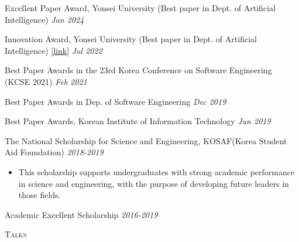 \documentclass[10pt]{article}
\newenvironment{changemargin}[2]{
  \begin{list}{}{
    \setlength{\topsep}{0pt}
    \setlength{\leftmargin}{#1}
    \setlength{\rightmargin}{#2}
    \setlength{\listparindent}{\parindent}
    \setlength{\itemindent}{\parindent}
    \setlength{\parsep}{\parskip}
  }
  \item[]}{\end{list}
}
\newcommand{\lineover}{
	\begin{changemargin}{-0.05in}{-0.05in}
		\vspace*{-8pt}
		\hrulefill \\
		\vspace*{-2pt}
	\end{changemargin}
}
\newcommand{\header}[1]{
	\begin{changemargin}{-0.5in}{-0.5in}
		\scshape{#1}\\
  	\lineover
	\end{changemargin}
}
\newcommand{\award}[2]{
	{#1} \hfill \emph{#2}\\ \medskip
}
\newenvironment{body} {
	\vspace*{-16pt}
	\begin{changemargin}{-0.25in}{-0.5in}
  }
	{\end{changemargin}
}
\begin{document}
\begin{body}
	\vspace{14pt}
\award{Excellent Paper Award, Yonsei University (Best paper in Dept. of Artificial Intelligence)} {Jan 2024}
\award{Innovation Award, Yonsei University (Best paper in Dept. of Artificial Intelligence) \href{https://www.yonsei.ac.kr/ocx/news.jsp?mode=view&ar_seq=20220708141917269049&sr_volume=632&list_mode=list&sr_site=S&pager.offset=0&sr_cates=29}{[link]}}{Jul 2022}
\award{Best Paper Awards in the 23rd Korea Conference on Software Engineering (KCSE 2021)}{Feb 2021}
\award{Best Paper Awards in Dep. of Software Engineering}{Dec 2019}
\award{Best Paper Awards, Korean Institute of Information Technology}{Jun 2019}
\award{The National Scholarship for Science and Engineering, KOSAF(Korea Student Aid Foundation)}{2018-2019}
    \begin{itemize} \itemsep -0pt  %
      \item This scholarship supports undergraduates with strong academic performance in science and engineering, with the purpose of developing future leaders in those fields.
  	\end{itemize}
\award{Academic Excellent Scholarship}{2016-2019}
\end{body}

\medskip

\header{Talks}
\end{document}
